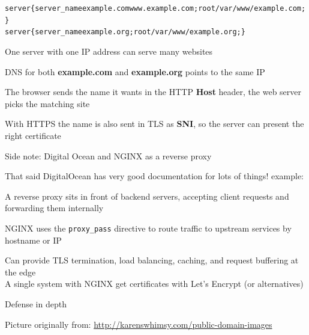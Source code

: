 \documentclass[Screen16to9,17pt]{foils}
\begin{document}

\begin{alltt}\footnotesize
server \{ server_name example.com www.example.com; root /var/www/example.com; \}
server \{ server_name example.org; root /var/www/example.org; \}
\end{alltt}


\begin{list2}
\item One server with one IP address can serve many websites
\item DNS for both {\bf example.com} and {\bf example.org} points to the same IP
\item The browser sends the name it wants in the HTTP {\bf Host} header, the web server picks the matching site
\item With HTTPS the name is also sent in TLS as {\bf SNI}, so the server can present the right certificate
\end{list2}

Side note: Digital Ocean and NGINX as a reverse proxy

That said DigitalOcean has very good documentation for lots of things! example:\\



\begin{list2}
\item A reverse proxy sits in front of backend servers, accepting client requests and forwarding them internally
\item NGINX uses the \verb+proxy_pass+ directive to route traffic to upstream services by hostname or IP
\item Can provide TLS termination, load balancing, caching, and request buffering at the edge\\
A single system with NGINX get certificates with Let's Encrypt (or alternatives)
\end{list2}







Defense in depth

\centerline{Picture originally from: \url{http://karenswhimsy.com/public-domain-images}}
\end{document}
